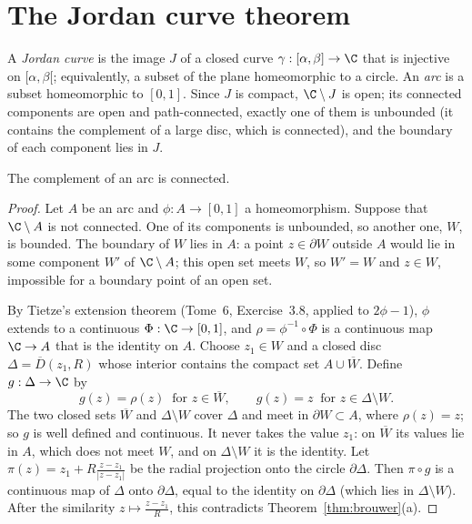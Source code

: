\section{The Jordan curve theorem}

A \emph{Jordan curve} is the image $J$ of a closed curve $\gamma:[\alpha,\beta]\to\C$ that is injective on $[\alpha,\beta[$; equivalently, a subset of the plane homeomorphic to a circle. An
\emph{arc} is a subset homeomorphic to $[0,1]$. Since $J$ is compact, $\C\setminus J$ is open; its connected components are open and path-connected, exactly one of them is
unbounded (it contains the complement of a large disc, which is connected), and the boundary of each component lies in $J$.

\begin{lemma}\label{lem:arc}
The complement of an arc is connected.
\end{lemma}
\begin{proof}
Let $A$ be an arc and $\phi:A\to[0,1]$ a homeomorphism. Suppose that $\C\setminus A$ is not connected. One of its components is unbounded, so another one, $W$, is bounded. The boundary of
$W$ lies in $A$: a point $z\in\partial W$ outside $A$ would lie in some component $W'$ of $\C\setminus A$; this open set meets $W$, so $W'=W$ and $z\in W$, impossible for a boundary point of an open
set.

By Tietze's extension theorem (Tome~6, Exercise~3.8, applied to $2\phi-1$), $\phi$ extends to a continuous $\Phi:\C\to[0,1]$, and $\rho=\phi^{-1}\circ\Phi$ is a continuous map $\C\to A$ that is
the identity on $A$. Choose $z_1\in W$ and a closed disc $\Delta=\overline D(z_1,R)$ whose interior contains the compact set $A\cup\overline W$. Define $g:\Delta\to\C$ by
\[
g(z)=\rho(z)\ \text{ for }z\in\overline W,\qquad g(z)=z\ \text{ for }z\in\Delta\setminus W.
\]
The two closed sets $\overline W$ and $\Delta\setminus W$ cover $\Delta$ and meet in $\partial W\subset A$, where $\rho(z)=z$; so $g$ is well defined and continuous. It never takes the value $z_1$:
on $\overline W$ its values lie in $A$, which does not meet $W$, and on $\Delta\setminus W$ it is the identity. Let $\pi(z)=z_1+R\frac{z-z_1}{|z-z_1|}$ be the radial projection onto the circle
$\partial\Delta$. Then $\pi\circ g$ is a continuous map of $\Delta$ onto $\partial\Delta$, equal to the identity on $\partial\Delta$ (which lies in $\Delta\setminus W$). After the similarity
$z\mapsto\frac{z-z_1}R$, this contradicts Theorem~\ref{thm:brouwer}(a).
\end{proof}

